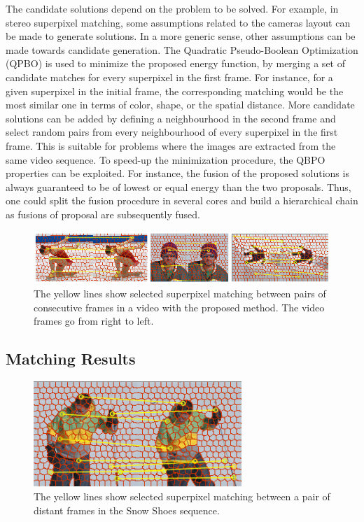 The candidate solutions depend on the problem to be solved. 
For example, in stereo superpixel matching, some assumptions related to the cameras 
layout can be made to generate solutions. In a more generic sense, other assumptions can be made towards 
candidate generation. 
The Quadratic Pseudo-Boolean Optimization (QPBO) \cite{c3}\cite{c4} is used to minimize the proposed energy function, 
by merging a set of candidate matches for every superpixel in the first frame.
For instance, for a given superpixel in the initial frame, the corresponding 
matching would be the most similar one in terms of color, shape, or the spatial distance. More candidate solutions can be added by defining a
neighbourhood in the second frame and select random pairs from every neighbourhood of every superpixel
in the first frame. This is suitable for problems where the images are extracted from the same video
sequence. 
To speed-up the minimization procedure, the QBPO properties can be exploited. For instance, the fusion of the
proposed solutions is always guaranteed to be of lowest or equal energy than the two proposals. Thus, one could
split the fusion procedure in several cores and build a hierarchical chain as fusions of proposal are subsequently fused.

   \begin{figure}[thpb]
      \centering
      \includegraphics[width=1.00\textwidth]{../images/matches.png}
      \caption{The yellow lines show selected superpixel
		matching between pairs of consecutive frames in a video
		with the proposed method. The video frames go from right
		to left.}
      \label{figurelabel_matches}
   \end{figure}

\subsection{Matching Results}
   \begin{figure}[thpb]
      \centering
      \includegraphics[width=0.70\textwidth]{../images/matches_snowshoes.png}
      \caption{The yellow lines show selected superpixel
		matching between a pair of distant frames in the Snow Shoes sequence.}
      \label{figurelabel_matchessnow}
   \end{figure}   
	\setlength{\belowcaptionskip}{-10pt}
	

